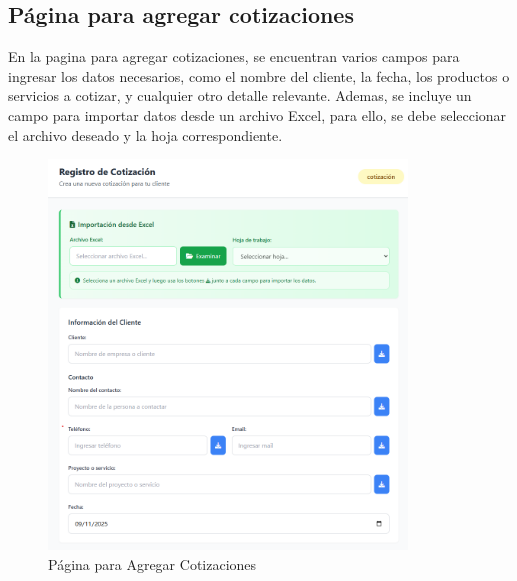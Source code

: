\documentclass{Pretexto/bluereport}
\begin{document}
\subsection{Página para agregar cotizaciones}

En la pagina para agregar cotizaciones, se encuentran varios campos para ingresar los datos necesarios, como el nombre del cliente, la fecha, los productos o servicios a cotizar, y cualquier otro detalle relevante.
Ademas, se incluye un campo para importar datos desde un archivo Excel, para ello, se debe seleccionar el archivo deseado y la hoja correspondiente.

\begin{figure}[H]
    \centering
    \includegraphics[width=0.85\textwidth]{img/agregar_cotizacion_pagina.png}
    \caption{Página para Agregar Cotizaciones}\label{fig:agregar_cotizacion_pagina}
\end{figure}
\end{document}
